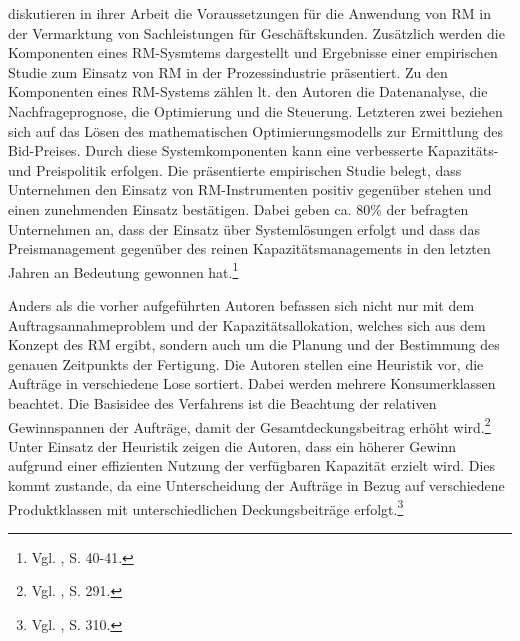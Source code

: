 \cite{kolisch2006revenue} diskutieren in ihrer Arbeit die Voraussetzungen für die Anwendung von RM in der Vermarktung von Sachleistungen für Geschäftskunden. Zusätzlich werden die Komponenten eines RM-Sysmtems dargestellt und Ergebnisse einer empirischen Studie zum Einsatz von RM in der Prozessindustrie präsentiert. Zu den Komponenten eines RM-Systems zählen lt. den Autoren die Datenanalyse, die Nachfrageprognose, die Optimierung und die Steuerung. Letzteren zwei beziehen sich auf das Lösen des mathematischen Optimierungsmodells zur Ermittlung des Bid-Preises. Durch diese Systemkomponenten kann eine verbesserte Kapazitäts- und Preispolitik erfolgen. Die präsentierte empirischen Studie belegt, dass Unternehmen den Einsatz von RM-Instrumenten positiv gegenüber stehen und einen zunehmenden Einsatz bestätigen. Dabei geben ca. 80\% der befragten Unternehmen an, dass der Einsatz über Systemlösungen erfolgt und dass das Preismanagement gegenüber des reinen Kapazitätsmanagements in den letzten Jahren an Bedeutung gewonnen hat.\footnote{Vgl. \cite{kolisch2006revenue}, S. 40-41.}

Anders als die vorher aufgeführten Autoren befassen sich \cite{DECI:DECI074} nicht nur mit dem Auftragsannahmeproblem und der Kapazitätsallokation, welches sich aus dem Konzept des RM ergibt, sondern auch um die Planung und der Bestimmung des genauen Zeitpunkts der Fertigung. Die Autoren stellen eine Heuristik vor, die Aufträge in verschiedene Lose sortiert. Dabei werden mehrere Konsumerklassen beachtet. Die Basisidee des Verfahrens ist die Beachtung der relativen Gewinnspannen der Aufträge, damit der Gesamtdeckungsbeitrag erhöht wird.\footnote{Vgl. \cite{DECI:DECI074}, S. 291.} Unter Einsatz der Heuristik zeigen die Autoren, dass ein höherer Gewinn aufgrund einer effizienten Nutzung der verfügbaren Kapazität erzielt wird. Dies kommt zustande, da eine Unterscheidung der Aufträge in Bezug auf verschiedene Produktklassen mit unterschiedlichen Deckungsbeiträge erfolgt.\footnote{Vgl. \cite{DECI:DECI074}, S. 310.}

